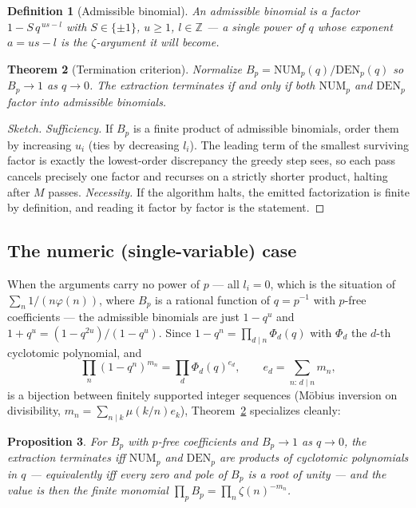 \documentclass[11pt]{article}
\newtheorem{theorem}{Theorem}
\newtheorem{proposition}[theorem]{Proposition}
\newtheorem{definition}[theorem]{Definition}
\begin{document}
\begin{definition}[Admissible binomial]
An \emph{admissible binomial} is a factor $1-S\,q^{\,us-l}$ with $S\in\{\pm1\}$,
$u\ge1$, $l\in\mathbb Z$ --- a single power of $q$ whose exponent $a=us-l$ is the
$\zeta$-argument it will become.
\end{definition}

\begin{theorem}[Termination criterion]
\label{thm:termination}
Normalize $B_p=\mathrm{NUM}_p(q)/\mathrm{DEN}_p(q)$ so $B_p\to1$ as $q\to0$. The
extraction terminates if and only if both $\mathrm{NUM}_p$ and $\mathrm{DEN}_p$
factor into admissible binomials.
\end{theorem}

\begin{proof}[Sketch]
\emph{Sufficiency.} If $B_p$ is a finite product of admissible binomials, order them
by increasing $u_i$ (ties by decreasing $l_i$). The leading term of the smallest
surviving factor is exactly the lowest-order discrepancy the greedy step sees, so
each pass cancels precisely one factor and recurses on a strictly shorter product,
halting after $M$ passes. \emph{Necessity.} If the algorithm halts, the emitted
factorization is finite by definition, and reading it factor by factor is the
statement.
\end{proof}

\subsection{The numeric (single-variable) case}

When the arguments carry no power of $p$ --- all $l_i=0$, which is the situation of
$\sum_n 1/(n\varphi(n))$, where $B_p$ is a rational function of $q=p^{-1}$ with
$p$-free coefficients --- the admissible binomials are just $1-q^u$ and
$1+q^u=(1-q^{2u})/(1-q^u)$. Since $1-q^n=\prod_{d\mid n}\Phi_d(q)$ with $\Phi_d$ the
$d$-th cyclotomic polynomial, and
\[
\prod_n (1-q^n)^{m_n}=\prod_d \Phi_d(q)^{e_d},\qquad e_d=\sum_{n:\,d\mid n} m_n,
\]
is a bijection between finitely supported integer sequences (M\"obius inversion on
divisibility, $m_n=\sum_{n\mid k}\mu(k/n)e_k$), Theorem~\ref{thm:termination}
specializes cleanly:

\begin{proposition}
\label{prop:cyclotomic}
For $B_p$ with $p$-free coefficients and $B_p\to1$ as $q\to0$, the extraction
terminates iff $\mathrm{NUM}_p$ and $\mathrm{DEN}_p$ are products of cyclotomic
polynomials in $q$ --- equivalently iff every zero and pole of $B_p$ is a root of
unity --- and the value is then the finite monomial
$\prod_p B_p=\prod_n\zeta(n)^{-m_n}$.
\end{proposition}
\end{document}
